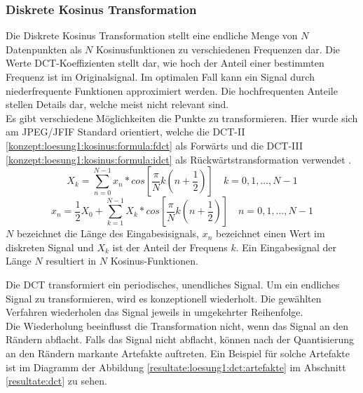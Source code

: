 \subsubsection{Diskrete Kosinus Transformation} \label{konzept:loesung1:kosinus}
Die Diskrete Kosinus Transformation stellt eine endliche Menge von $N$ Datenpunkten als $N$ Kosinusfunktionen zu verschiedenen Frequenzen dar. Die Werte DCT-Koeffizienten stellt dar, wie hoch der Anteil einer bestimmten Frequenz ist im Originalsignal. Im optimalen Fall kann ein Signal durch niederfrequente Funktionen approximiert werden. Die hochfrequenten Anteile stellen Details dar, welche meist nicht relevant sind.\\
Es gibt verschiedene Möglichkeiten die Punkte zu transformieren. Hier wurde sich am JPEG/JFIF Standard orientiert, welche die DCT-II \eqref{konzept:loesung1:kosinus:formula:fdct} als Forwärts und die DCT-III \eqref{konzept:loesung1:kosinus:formula:idct} als Rückwärtstransformation verwendet \cite{wallace1992jpeg}. 
\begin{equation} \label{konzept:loesung1:kosinus:formula:fdct}
	X_k = \sum_{n=0}^{N-1}x_n*cos[\frac{\pi}{N}k(n+\frac{1}{2})] \quad k = 0, 1, \ldots, N-1
\end{equation}
\begin{equation} \label{konzept:loesung1:kosinus:formula:idct}
x_n  = \frac{1}{2}X_0 + \sum_{k=1}^{N-1}X_k*cos[\frac{\pi}{N}k(n+\frac{1}{2})] \quad n = 0,1,\ldots,N-1
\end{equation}
$N$ bezeichnet die Länge des Eingabesisignals, $x_n$ bezeichnet einen Wert im diskreten Signal und $X_k$ ist der Anteil der Frequens $k$. Ein Eingabesignal der Länge $N$ resultiert in $N$ Kosinus-Funktionen.

Die DCT transformiert ein periodisches, unendliches Signal. Um ein endliches Signal zu transformieren, wird es konzeptionell wiederholt. Die gewählten Verfahren wiederholen das Signal jeweils in umgekehrter Reihenfolge.\\
Die Wiederholung beeinflusst die Transformation nicht, wenn das Signal an den Rändern abflacht. Falls das Signal nicht abflacht, können nach der Quantisierung an den Rändern markante Artefakte auftreten. Ein Beispiel für solche Artefakte ist im Diagramm der Abbildung \ref{resultate:loesung1:dct:artefakte} im Abschnitt \ref{resultate:dct} zu sehen.

